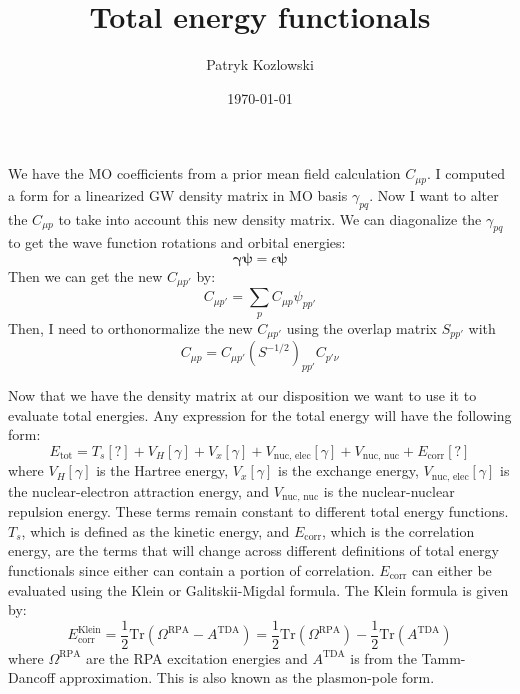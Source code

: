 \documentclass[12pt]{article}
\title{Total energy functionals}
\author{Patryk Kozlowski}
\date{\today}
\begin{document}
\maketitle
We have the MO coefficients from a prior mean field calculation $C_{\mu p}$. I computed a form for a linearized GW density matrix in MO basis $\gamma _{pq}$. Now I want to alter the $C_{\mu p}$ to take into account this new density matrix. We can diagonalize the $\gamma _{pq}$ to get the wave function rotations and orbital energies:
\begin{equation}
    \boldsymbol{\gamma }\boldsymbol{\psi } = \epsilon \boldsymbol{\psi }
\end{equation}
Then we can get the new $C_{\mu p'}$ by:
\begin{equation}
    C_{\mu p'} = \sum_{p} C_{\mu p} \psi _{pp'}
\end{equation}
Then, I need to orthonormalize the new $C_{\mu p'}$ using the overlap matrix $S_{pp'}$ with
\begin{equation}
    C_{\mu p} = C_{\mu p'} (S^{-1/2})_{pp'} C _{p' \nu}
\end{equation}

Now that we have the density matrix at our disposition we want to use it to evaluate total energies. Any expression for the total energy will have the following form:
\begin{equation}
    E_{\text{tot}}=T_s [? ] + V_H [\gamma ] + V_x [\gamma ] + V_{\text{nuc, elec}} [\gamma ] + V_{\text{nuc, nuc}}+ E_{\text{corr}} [? ]
\end{equation}
where $V_H[\gamma ]$ is the Hartree energy, $V_x [\gamma ]$ is the exchange energy, $V_{\text{nuc, elec}} [\gamma ]$ is the nuclear-electron attraction energy, and $V_{\text{nuc, nuc}}$ is the nuclear-nuclear repulsion energy. These terms remain constant to different total energy functions. $T_s$, which is defined as the kinetic energy, and $E_{\text{corr}}$, which is the correlation energy, are the terms that will change across different definitions of total energy functionals since either can contain a portion of correlation. $E_{\text{corr}}$ can either be evaluated using the Klein or Galitskii-Migdal formula. The Klein formula is given by:
\begin{equation}
    E_{\text{corr}}^{\text{Klein}} = \frac{1}{2} \text{Tr} (\Omega ^{\text{RPA}} - A^{\text{TDA}})
    = \frac{1}{2} \text{Tr} (\Omega ^{\text{RPA}} ) - \frac{1}{2} \text{Tr} (A^{\text{TDA}})
\end{equation}
where $\Omega ^{\text{RPA}}$ are the RPA excitation energies and $A^{\text{TDA}}$ is from the Tamm-Dancoff approximation. This is also known as the plasmon-pole form.
\end{document}
